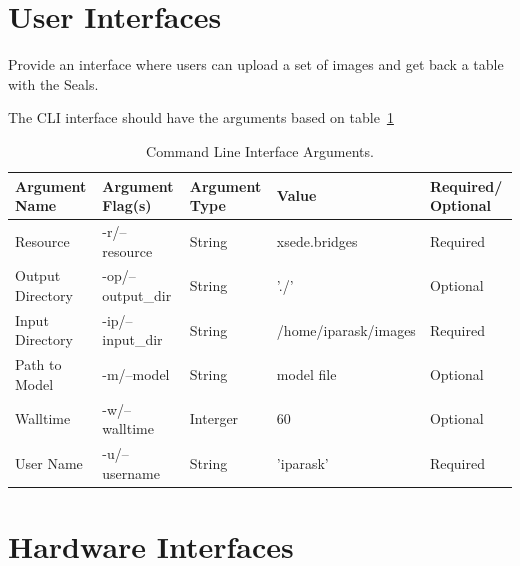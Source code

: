 \documentclass{scrreprt}
\begin{document}
\section{User Interfaces}

Provide an interface where users can upload a set of images and get back a table 
with the Seals.

The CLI interface should have the arguments based on table~\ref{tab:cli_interface}

\begin{table}[ht]
	\centering
	\begin{tabular}{|p{2.5cm}|p{2.2cm}|p{1.8cm}|p{4cm}|p{2cm}|}
		\hline
		Argument Name    & Argument Flag(s)  & Argument Type & Value                & Required/ Optional\\\hline
		Resource         & -r/--resource     & String        & xsede.bridges        & Required\\\hline
		Output Directory & -op/--output\_dir & String        & './'                 & Optional\\\hline
		Input Directory  & -ip/--input\_dir  & String        & /home/iparask/images & Required\\\hline
		Path to Model    & -m/--model        & String        & model file           & Optional\\\hline
		Walltime         & -w/--walltime     & Interger      & 60                   & Optional\\\hline
		User Name        & -u/--username     & String        & 'iparask'            & Required\\
		\hline
	\end{tabular}
	\caption{Command Line Interface Arguments.\label{tab:cli_interface}}
\end{table}


\section{Hardware Interfaces}

\end{document}
